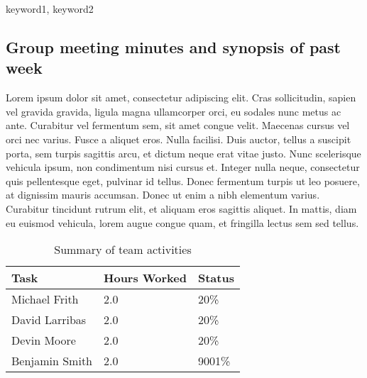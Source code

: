 \documentclass[12pt,article]{IEEEtran}
\newcommand{\KEYWORDS}{keyword1, keyword2}
\newcommand{\ABSTRACT}{we think....}
\begin{document}


\begin{keywords}
\KEYWORDS
\end{keywords}

\begin{abstract}
\ABSTRACT
\end{abstract}
	 

\subsection{Group meeting minutes and synopsis of past week}

Lorem ipsum dolor sit amet, consectetur adipiscing elit. Cras sollicitudin, sapien vel gravida gravida, ligula magna ullamcorper orci, eu sodales nunc metus ac ante. Curabitur vel fermentum sem, sit amet congue velit. Maecenas cursus vel orci nec varius. Fusce a aliquet eros. Nulla facilisi. Duis auctor, tellus a suscipit porta, sem turpis sagittis arcu, et dictum neque erat vitae justo. Nunc scelerisque vehicula ipsum, non condimentum nisi cursus et. Integer nulla neque, consectetur quis pellentesque eget, pulvinar id tellus. Donec fermentum turpis ut leo posuere, at dignissim mauris accumsan. Donec ut enim a nibh elementum varius. Curabitur tincidunt rutrum elit, et aliquam eros sagittis aliquet. In mattis, diam eu euismod vehicula, lorem augue congue quam, et fringilla lectus sem sed tellus.

\begin{table}[ht]
\renewcommand{\arraystretch}{1.3}
	\caption{Summary of team activities}
	
	\label{Summary of team activities}
	
	\centering
	\begin{tabular}{p{5.5cm}|p{1cm}|p{1cm}}
	\hline
	\bfseries 	Task		 		& \bfseries Hours Worked	& \bfseries Status	\\
	\hline
	\hline
				Michael Frith		& 2.0						& 20\%				\\	%
				David Larribas 		& 2.0						& 20\%				\\	
				Devin Moore 		& 2.0						& 20\%				\\	
				Benjamin Smith		& 2.0						& 9001\%			\\	
	\hline
	\end{tabular}
\end{table}
\end{document}
